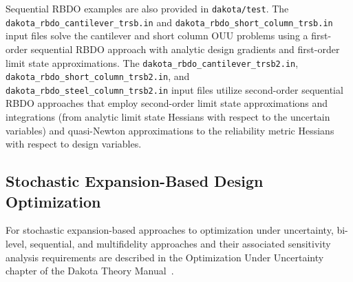 Sequential RBDO examples are also provided in \texttt{dakota/test}. 
The \texttt{dakota\_rbdo\_cantilever\_trsb.in} and
\texttt{dakota\_rbdo\_short\_column\_trsb.in} input files solve 
the cantilever and short column OUU problems using a first-order
sequential RBDO approach with analytic design gradients and
first-order limit state approximations. The
\texttt{dakota\_rbdo\_cantilever\_trsb2.in},
\texttt{dakota\_rbdo\_short\_column\_trsb2.in}, and 
\texttt{dakota\_rbdo\_steel\_column\_trsb2.in} input files 
utilize second-order sequential RBDO approaches that employ
second-order limit state approximations and integrations (from
analytic limit state Hessians with respect to the uncertain variables)
and quasi-Newton approximations to the reliability metric Hessians
with respect to design variables.

\subsection{Stochastic Expansion-Based Design Optimization} \label{adv_models:ouu:sebdo}

For stochastic expansion-based approaches to optimization under
uncertainty, bi-level, sequential, and multifidelity approaches and
their associated sensitivity analysis requirements are described in
the Optimization Under Uncertainty chapter of the Dakota Theory
Manual~\cite{TheoMan}.

